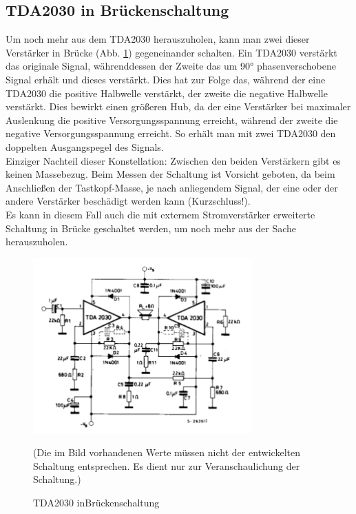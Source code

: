 \newpage
\subsection{TDA2030 in Brückenschaltung}\label{subsec:8.3.4}
Um noch mehr aus dem TDA2030 herauszuholen, kann man zwei dieser Verstärker in Brücke (Abb. \ref{fig:8.3.4.1}) gegeneinander schalten.
Ein TDA2030 verstärkt das originale Signal, währenddessen der Zweite das um 90° phasenverschobene Signal erhält und dieses verstärkt.
Dies hat zur Folge das, während der eine TDA2030 die positive Halbwelle verstärkt, der zweite die negative Halbwelle verstärkt.
Dies bewirkt einen größeren Hub, da der eine Verstärker bei maximaler Auslenkung die positive Versorgungsspannung erreicht, während der zweite die negative Versorgungsspannung erreicht.
So erhält man mit zwei TDA2030 den doppelten Ausgangspegel des Signals.\\
Einziger Nachteil dieser Konstellation: Zwischen den beiden Verstärkern gibt es keinen Massebezug.
Beim Messen der Schaltung ist Vorsicht geboten, da beim Anschließen der Tastkopf-Masse, je nach anliegendem Signal, der eine oder der andere Verstärker beschädigt werden kann (Kurzschluss!).\\
Es kann in diesem Fall auch die mit externem Stromverstärker erweiterte Schaltung in Brücke geschaltet werden, um noch mehr aus der Sache herauszuholen.
\begin{figure} [H]
	\centering
	\includegraphics[width=0.75\textwidth]{img/Grundlagen/TDA2030/TDA2030-H-Bruecke.PNG}
	\caption[TDA2030 in Brückenschaltung]{TDA2030 inBrückenschaltung\footnotemark}
	\text (Die im Bild vorhandenen Werte müssen nicht der entwickelten Schaltung entsprechen. Es dient nur zur Veranschaulichung der Schaltung.)
	\label {fig:8.3.4.1}
\end{figure}


